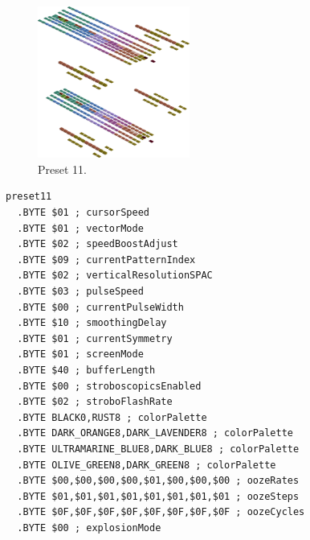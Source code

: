\vspace*{-0.5cm}
\begin{minipage}[b]{0.48\linewidth}
\begin{figure}[H]                                                          
  \centering                                                             
  \begin{adjustbox}{width=5cm,center}                                   
  \includegraphics[width=5cm]{src/colorspace_presets/preset11-45.png}%
  \end{adjustbox}                                                        
\caption*{Preset 11.}                                           
\end{figure}                                                               
\end{minipage}
\hspace{0.1cm}
\begin{minipage}[b]{0.48\linewidth}                                                                         
\begin{lstlisting}[basicstyle=\ttfamily\tiny]
preset11
  .BYTE $01 ; cursorSpeed
  .BYTE $01 ; vectorMode
  .BYTE $02 ; speedBoostAdjust
  .BYTE $09 ; currentPatternIndex
  .BYTE $02 ; verticalResolutionSPAC
  .BYTE $03 ; pulseSpeed
  .BYTE $00 ; currentPulseWidth
  .BYTE $10 ; smoothingDelay
  .BYTE $01 ; currentSymmetry
  .BYTE $01 ; screenMode
  .BYTE $40 ; bufferLength
  .BYTE $00 ; stroboscopicsEnabled
  .BYTE $02 ; stroboFlashRate
  .BYTE BLACK0,RUST8 ; colorPalette
  .BYTE DARK_ORANGE8,DARK_LAVENDER8 ; colorPalette
  .BYTE ULTRAMARINE_BLUE8,DARK_BLUE8 ; colorPalette
  .BYTE OLIVE_GREEN8,DARK_GREEN8 ; colorPalette
  .BYTE $00,$00,$00,$00,$01,$00,$00,$00 ; oozeRates
  .BYTE $01,$01,$01,$01,$01,$01,$01,$01 ; oozeSteps
  .BYTE $0F,$0F,$0F,$0F,$0F,$0F,$0F,$0F ; oozeCycles
  .BYTE $00 ; explosionMode
\end{lstlisting}
\end{minipage}


